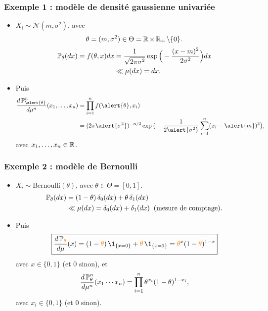 \begin{frame}
\frametitle{Exemple 1 : modèle de densité gaussienne univariée}
\begin{itemize}
\item $X_i\sim {\mathcal N}(m,\sigma^2)$,
avec
$$\theta = (m,\sigma^2) \in \Theta = \operatorname{{\mathbb R}}\times \operatorname{{\mathbb R}}_+\setminus\{0\}.$$
\begin{align*}
\operatorname{{\mathbb P}}_\theta(dx) = f(\theta,x)dx & =\frac{1}{\sqrt{2\pi \sigma^2}}\exp\Big(-\frac{(x-m)^2}{2\sigma^2}\Big)dx \\
& \ll \mu(dx)=dx.
\end{align*}
\item Puis
\begin{align*}
\frac{d\PP_{\alert{\theta}}^n}{d\mu^n}(x_1,\ldots, x_n) & = \prod_{i = 1}^n f(\alert{\theta},x_i) \\
& =(2\pi \alert{\sigma^2})^{-n/2}\exp\big(-\frac{1}{2\alert{\sigma^2}}\sum_{i = 1}^n (x_i-\alert{m})^2\big),
\end{align*}
avec $x_1,\ldots,x_n \in \operatorname{{\mathbb R}}$.
\end{itemize}
\end{frame}

\begin{frame}
\frametitle{Exemple 2 :  modèle de Bernoulli}
\begin{itemize}
\item $X_i \sim \text{Bernoulli}(\theta)$, avec $\theta \in \Theta = [0,1]$.
\begin{align*}
\operatorname{{\mathbb P}}_\theta(dx)& = (1-\theta)\, \delta_{0}(dx) + \theta\, \delta_1(dx) \\
& \ll \mu(dx) = \delta_0(dx)+\delta_1(dx)\;\;\text{(mesure de comptage)}.
\end{align*}
\item Puis
$$\boxed{\frac{d\PP_{\tco{\theta}}}{d\mu}(x) = (1-\tco{\theta})\,\1_{\{x=0\}}+\tco{\theta}\,\1_{\{x=1\}} = \tco{\theta}^x(1-\tco{\theta})^{1-x}}
$$
\alert{avec $x\in \{0,1\}$} (et $0$ sinon), et
$$\frac{d\operatorname{{\mathbb P}}_\theta^n}{d\mu^n}(x_1\cdots x_n) = \prod_{i = 1}^n \theta^{x_i}(1-\theta)^{1-x_i},$$
\alert{avec $x_i \in \{0,1\}$} (et $0$ sinon).
\end{itemize}
\end{frame}


